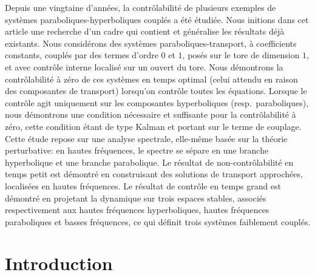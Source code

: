 \documentclass[JEP,XML,SOM,Unicode,NoEqCountersInSection]{cedram}
\theoremstyle{plain}
\theoremstyle{definition}
\theoremstyle{remark}
\begin{document}




\begin{altabstract}
Depuis une vingtaine d'années, la contrôlabilité de plusieurs exemples de systèmes paraboliques-hyperboliques couplés a été étudiée. Nous initions dans cet article une recher\-che d'un cadre qui contient et généralise les résultats déjà existants.
Nous considérons des systèmes paraboliques-transport, à coefficients constants, couplés par des termes d'ordre $0$ et $1$, posés sur le tore de dimension $1$, et avec contrôle interne localisé sur un ouvert du tore.
Nous démontrons la contrôlabilité à zéro de ces systèmes en temps optimal (celui attendu en raison des composantes de transport) lorsqu'on contrôle toutes les équations. Lorsque le contrôle agit uniquement sur les composantes hyperboliques (resp.\ paraboliques), nous démontrons une condition nécessaire et suffisante pour la contrôlabilité à zéro, cette condition étant de type Kalman et portant sur le terme de couplage.
Cette étude repose sur une analyse spectrale, elle-même basée sur la théorie perturbative: en hautes fréquences, le spectre se sépare en une branche hyperbolique et une branche parabolique. Le résultat de non-contrôlabilité en temps petit est démontré en construisant des solutions de transport approchées, localisées en hautes fréquences. Le résultat de contrôle en temps grand est démontré en projetant la dynamique sur trois espaces stables, associés respectivement aux hautes fréquences hyperboliques, hautes fréquences paraboliques et basses fréquences, ce qui définit trois systèmes faiblement couplés.
\end{altabstract}

\maketitle
\tableofcontents
\vspace*{-\baselineskip}\vskip0pt%
\mainmatter

\section{Introduction}
\end{document}
